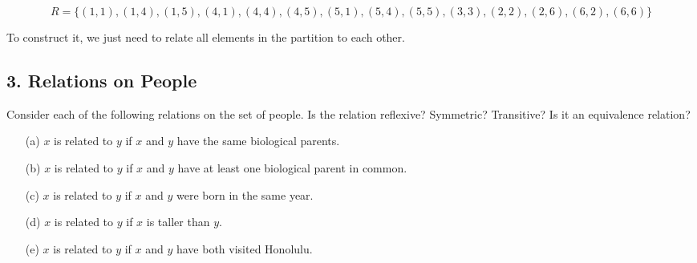 \documentclass{article}
\begin{document}
\[
R = \{(1, 1), (1, 4), (1, 5), (4, 1), (4, 4), (4, 5), (5, 1), (5, 4), (5, 5), (3, 3), (2, 2), (2, 6), (6, 2), (6, 6)\}
\]

To construct it, we just need to relate all elements in the partition to each other. 

\subsection*{3. Relations on People}

Consider each of the following relations on the set of people. Is the relation reflexive? Symmetric? Transitive? Is it an equivalence relation?

\begin{enumerate}
    \item[(a)] $x$ is related to $y$ if $x$ and $y$ have the same biological parents.
    \item[(b)] $x$ is related to $y$ if $x$ and $y$ have at least one biological parent in common.
    \item[(c)] $x$ is related to $y$ if $x$ and $y$ were born in the same year.
    \item[(d)] $x$ is related to $y$ if $x$ is taller than $y$.
    \item[(e)] $x$ is related to $y$ if $x$ and $y$ have both visited Honolulu.
\end{enumerate}
\end{document}
